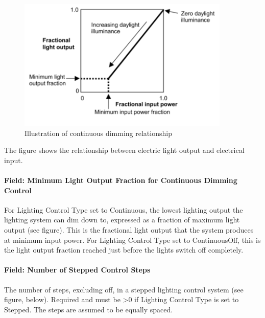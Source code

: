 \begin{figure}[hbtp] %
\centering
\includegraphics[width=0.9\textwidth, height=0.9\textheight, keepaspectratio=true]{media/image096.png}
\caption{Illustration of continuous dimming relationship \protect \label{fig:illustration-of-continuous-dimming}}
\end{figure}

The figure shows the relationship between electric light output and electrical input.

\paragraph{Field: Minimum Light Output Fraction for Continuous Dimming Control}\label{field-minimum-light-output-fraction-for-continuous-dimming-control}

For Lighting Control Type set to Continuous, the lowest lighting output the lighting system can dim down to, expressed as a fraction of maximum light output (see figure). This is the fractional light output that the system produces at minimum input power. For Lighting Control Type set to ContinuousOff, this is the light output fraction reached just before the lights switch off completely.

\paragraph{Field: Number of Stepped Control Steps}\label{field-number-of-stepped-control-steps}

The number of steps, excluding off, in a stepped lighting control system (see figure, below). Required and must be \textgreater{}0 if Lighting Control Type is set to Stepped. The steps are assumed to be equally spaced.

